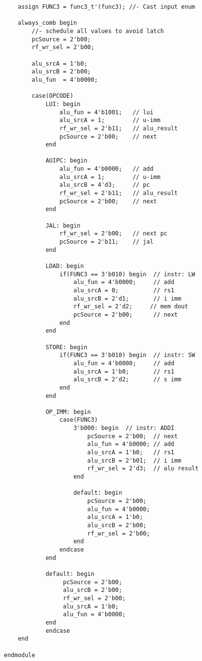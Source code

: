 \documentclass{article}
\begin{document}
\begin{verbatim}
    assign FUNC3 = func3_t'(func3); //- Cast input enum 
       
    always_comb begin 
        //- schedule all values to avoid latch
        pcSource = 2'b00;  
        rf_wr_sel = 2'b00; 
        
        alu_srcA = 1'b0;   
        alu_srcB = 2'b00;    
        alu_fun  = 4'b0000;
        
        case(OPCODE)
            LUI: begin
                alu_fun = 4'b1001;   // lui
                alu_srcA = 1;        // u-imm 
                rf_wr_sel = 2'b11;   // alu_result
                pcSource = 2'b00;    // next
            end
            
            AUIPC: begin
                alu_fun = 4'b0000;   // add
                alu_srcA = 1;        // u-imm
                alu_srcB = 4'd3;     // pc
                rf_wr_sel = 2'b11;   // alu_result
                pcSource = 2'b00;    // next
            end
            
            JAL: begin
                rf_wr_sel = 2'b00;   // next pc
                pcSource = 2'b11;    // jal
            end
            
            LOAD: begin
                if(FUNC3 == 3'b010) begin  // instr: LW 
                    alu_fun = 4'b0000;     // add
                    alu_srcA = 0;          // rs1
                    alu_srcB = 2'd1;       // i imm
                    rf_wr_sel = 2'd2;     // mem dout
                    pcSource = 2'b00;      // next
                end
            end
            
            STORE: begin
                if(FUNC3 == 3'b010) begin  // instr: SW
                    alu_fun = 4'b0000;     // add
                    alu_srcA = 1'b0;       // rs1
                    alu_srcB = 2'd2;       // s imm
                end
            end
            
            OP_IMM: begin
                case(FUNC3)
                    3'b000: begin  // instr: ADDI
                        pcSource = 2'b00;  // next
                        alu_fun = 4'b0000; // add
                        alu_srcA = 1'b0;   // rs1
                        alu_srcB = 2'b01;  // i imm
                        rf_wr_sel = 2'd3;  // alu result
                    end
                    
                    default: begin
                        pcSource = 2'b00; 
                        alu_fun = 4'b0000;
                        alu_srcA = 1'b0; 
                        alu_srcB = 2'b00; 
                        rf_wr_sel = 2'b00; 
                    end
                endcase
            end

            default: begin
                 pcSource = 2'b00; 
                 alu_srcB = 2'b00; 
                 rf_wr_sel = 2'b00; 
                 alu_srcA = 1'b0; 
                 alu_fun = 4'b0000;
            end
            endcase
    end

endmodule
\end{verbatim}
\end{document}
